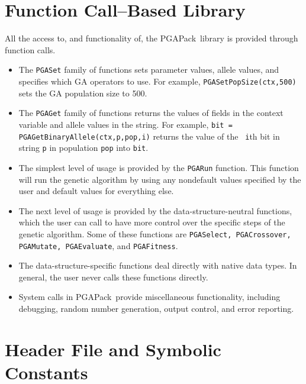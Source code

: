 \documentclass{report}
\newcommand{\pga}{PGAPack}
\begin{document}
\section{Function Call--Based Library}\label{sec:function}

All the access to, and functionality of, the \pga\ library is provided
through function calls.

\begin{itemize}

\item
The {\tt PGASet} family of functions sets parameter values, allele values, and
specifies which GA operators to use.  For example, {\tt PGASetPopSize(ctx,500)}
sets the GA population size to 500.

\item
The {\tt PGAGet} family of functions returns the values of fields in the
context variable and allele values in the string.  For example, {\tt bit =
PGAGetBinaryAllele(ctx,p,pop,i)} returns the value of the {\tt
i}th bit in string {\tt p} in population {\tt pop} into {\tt bit}.

\item
The simplest level of usage is provided by the {\tt PGARun} function.  This
function will run the genetic algorithm by using any nondefault values specified
by the user and default values for everything else.

\item
The next level of usage is provided by the data-structure-neutral functions,
which the user can call to have more control over the specific steps of the
genetic algorithm.  Some of these functions are {\tt PGASelect, PGACrossover,
PGAMutate, PGAEvaluate}, and {\tt PGAFitness}.

\item
The data-structure-specific functions deal directly with native
data types.  In general, the user never calls these functions directly.

\item 
System calls in \pga\ provide miscellaneous functionality, including debugging,
random number generation, output control, and error reporting.

\end{itemize}

\section{Header File and Symbolic Constants}\label{sec:header}
\end{document}
